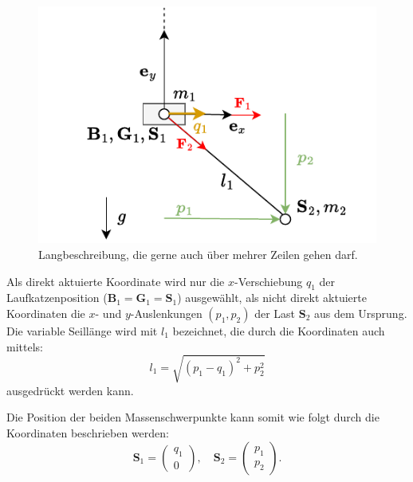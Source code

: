 \begin{figure}[ht]
	\begin{center}
		\includegraphics[scale=1]{Pictures/ODE_flatness_analysis_single_crane_diagram}
	\end{center}
	\caption[Kurzbeschreibung für Abbildungsverzeichnis]
	{Langbeschreibung, die gerne auch über mehrer Zeilen gehen darf.}
	\label{fig:single_crane_diagram}
\end{figure}

Als direkt aktuierte Koordinate wird nur die $x$-Verschiebung $q_1$ der Laufkatzenposition ($\mathbf{B}_1 = \mathbf{G}_1 = \mathbf{S}_1$) ausgewählt, als nicht direkt aktuierte Koordinaten die $x$- und $y$-Auslenkungen $(p_1, p_2)$ der Last $\mathbf{S}_2$ aus dem Ursprung. Die variable Seillänge wird mit $l_1$ bezeichnet, die durch die Koordinaten auch mittels:
\begin{equation}
	l_1 = \sqrt{(p_1 - q_1)^2 + p_2^2}
\end{equation}
ausgedrückt werden kann.

Die Position der beiden Massenschwerpunkte kann somit wie folgt durch die Koordinaten beschrieben werden:
\begin{equation}
	\mathbf{S}_1 =
	\begin{pmatrix}
		q_1 \\
		0
	\end{pmatrix}, 
	\quad
	\mathbf{S}_2 =
	\begin{pmatrix}
		p_1 \\
		p_2
	\end{pmatrix}.
\end{equation}

